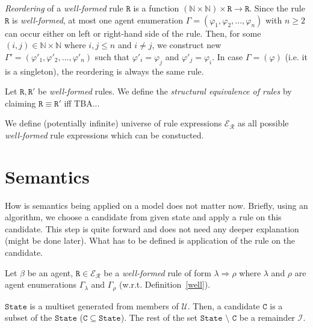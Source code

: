 \documentclass{entcs}
\renewcommand{\~}[0]{\texttildelow}
\begin{document}
\begin{defn}
\emph{Reordering} of a \emph{well-formed} rule $\mathtt{R}$ is a function $(\mathbb{N} \times \mathbb{N}) \times \mathtt{R} \rightarrow \mathtt{R}$. Since the rule $\mathtt{R}$ is \emph{well-formed}, at most one agent enumeration $\Gamma = (\varphi_1, \varphi_2, ..., \varphi_n)$ with $n \geq 2$ can occur either on left or right-hand side of the rule. Then, for some $(i, j) \in \mathbb{N} \times \mathbb{N}$ where $ i,j \leq n $ and $ i \neq j $, we construct new $\Gamma' = (\varphi'_1, \varphi'_2, ..., \varphi'_n)$ such that $\varphi'_i = \varphi_j$ and $\varphi'_j = \varphi_i$. In case $\Gamma = (\varphi)$ (i.e. it is a singleton), the reordering is always the same rule.
\end{defn}

\begin{defn}
Let $\mathtt{R},\mathtt{R}'$ be \emph{well-formed} rules. We define the \emph{structural equivalence of rules} by claiming $\mathtt{R} \equiv \mathtt{R}'$ iff TBA...
\end{defn}

\begin{theorem}
We define (potentially infinite) universe of rule expressions $\mathcal{E}_\mathcal{R} $ as all possible \emph{well-formed} rule expressions which can be constucted.
\end{theorem}

\section{Semantics}

How is semantics being applied on a model does not matter now. Briefly, using an algorithm, we choose a candidate from given state and apply a rule on this candidate. This step is quite forward and does not need any deeper explanation (might be done later). What has to be defined is application of the rule on the candidate.

Let $\beta$ be an agent, $\mathtt{R} \in \mathcal{E}_\mathcal{R}$ be a \emph{well-formed} rule of form $\lambda \Rightarrow \rho$ where $\lambda$ and $\rho$ are agent enumerations $\Gamma_\lambda$ and $\Gamma_\rho$ (w.r.t. Definition~\ref{well}).

\begin{defn}
$\mathtt{State}$ is a multiset generated from members of $\mathcal{U}$. Then, a candidate $\mathtt{C}$ is a subset of the $\mathtt{State}$ ($\mathtt{C} \subseteq \mathtt{State}$). The rest of the set $ \mathtt{State}$ $\setminus$ $\mathtt{C}$ be a remainder $\mathcal{I}$.
\end{defn}
\end{document}
